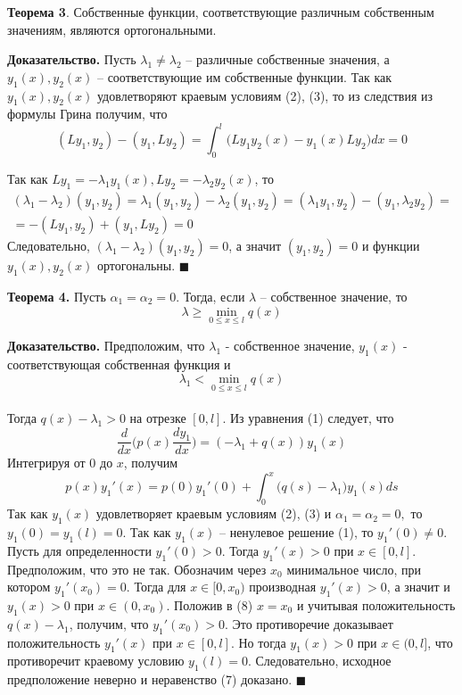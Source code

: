 \textbf{Теорема 3}. Собственные функции, соответствующие различным собственным значениям, являются ортогональными.

\textbf{Доказательство.} Пусть $\lambda_1 \neq \lambda_2$ – различные собственные значения, а $y_1(x), y_2(x)$ – соответствующие им собственные функции. Так как $y_1(x), y_2(x)$ удовлетворяют краевым условиям (2), (3), то из следствия
из формулы Грина получим, что
\begin{equation*}
(Ly_1,y_2)-(y_1,Ly_2)= \int_{0}^{l}\big( Ly_1 y_2(x) - y_1(x) Ly_2 \big) dx = 0
\end{equation*}

Так как $Ly_1 = -\lambda_1y_1(x), Ly_2 = -\lambda_2y_2(x)$, то
\begin{gather*}
(\lambda_1-\lambda_2)(y_1,y_2)=\lambda_1(y_1,y_2)-\lambda_2(y_1,y_2)=(\lambda_1 y_1,y_2)-(y_1,\lambda_2 y_2)=\\
=-(Ly_1,y_2)+(y_1,Ly_2)=0
\end{gather*}
Следовательно, $(\lambda_1 - \lambda_2)(y_1, y_2) = 0$, а значит $(y_1, y_2) = 0$ и функции
$y_1(x), y_2(x)$ ортогональны. $\blacksquare$

\textbf{Теорема 4.} Пусть $\alpha_1 = \alpha_2 = 0$. Тогда, если $\lambda$ – собственное значение, то
\begin{equation*}
    \lambda \geq \min_{0 \leq x \leq l} q(x)
\end{equation*}

\textbf{Доказательство.} Предположим, что $\lambda_1$ - собственное значение, $y_1(x)$
- соответствующая собственная функция и
\begin{equation*}
\lambda_1 < \min_{0 \leq x \leq l} q(x)
\end{equation*}
\\Тогда $q(x)- \lambda_1 > 0$ на отрезке $[0, l]$. Из уравнения (1) следует, что
\begin{equation*}
\frac{d}{d x} \Big( p(x) \frac{d y_1}{d x} \Big) = (-\lambda_1+q(x))y_1(x)
\end{equation*}
Интегрируя от $0$ до $x$, получим
\begin{equation*}
    p(x)y_1'(x) = p(0)y_1'(0) + \int_{0}^{x}\big(q(s)-\lambda_1\big)y_1(s)ds
\end{equation*}
Так как $y_1(x)$ удовлетворяет краевым условиям (2), (3) и $\alpha_1 =
\alpha_2 = 0,$ то $y_1(0) = y_1(l) = 0$. Так как $y_1(x)$ – ненулевое решение (1), то
$y_1'(0) \neq 0$. Пусть для определенности $y_1'(0)>0$. Тогда $y_1'(x)>0$ при
$x \in [0, l]$. Предположим, что это не так. Обозначим через $x_0$ минимальное
число, при котором $y_1'(x_0) = 0$. Тогда для $x \in [0, x_0)$ производная $y_1'(x) >
0$, а значит и $y_1(x) > 0$ при $x \in (0, x_0)$. Положив в (8) $x = x_0$ и
учитывая положительность $q(x) - \lambda_1$, получим, что $y_1'(x_0) > 0$. Это
противоречие доказывает положительность $y_1'(x)$ при $x \in [0, l]$. Но тогда
$y_1(x) > 0$ при $x \in (0, l]$, что противоречит краевому условию $y_1(l) = 0$.
Следовательно, исходное предположение неверно и неравенство (7) доказано. $\blacksquare$

